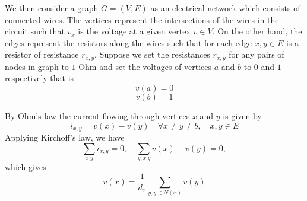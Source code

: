 \documentclass[10pt,a4paper]{article}
\begin{document}
We then consider a graph $G=(V,E)$ as an electrical network which consists of connected wires. The vertices  represent the intersections of the wires in the circuit such that $v_x$ is the voltage at a given vertex $v \in V$. On the other hand, the edges represent the resistors along the wires such that for each edge $x,y \in E$ is a resistor of resistance $r_{x,y}$.
Suppose we set the resistances $r_{x,y}$ for any pairs of nodes in graph to $1$ Ohm and set the voltages of vertices $a$ and $b$ to $0$ and $1$ respectively that is 
\begin{equation}
v(a) = 0
\label{eqnv1}
\end{equation}
\begin{equation}
v(b) = 1
\label{eqnv2}
\end{equation}
 

By Ohm's law the current flowing through vertices $x$ and $y$ is given by
\begin{equation}
i_{x,y} = v(x) -v(y) \quad \forall x\neq y\neq b, \quad x,y \in E
\end{equation}
Applying Kirchoff's law, we have
\begin{equation}
\sum_{x~y} i_{x,y} =0 , \quad \sum_{y,x~y} v(x) -v(y)  =0,
\end{equation}
which gives
\begin{equation}
v(x) = \frac{1}{d_x} \sum_{y, y \in N(x)} v(y)
\label{eqnv3}
\end{equation}
\end{document}

